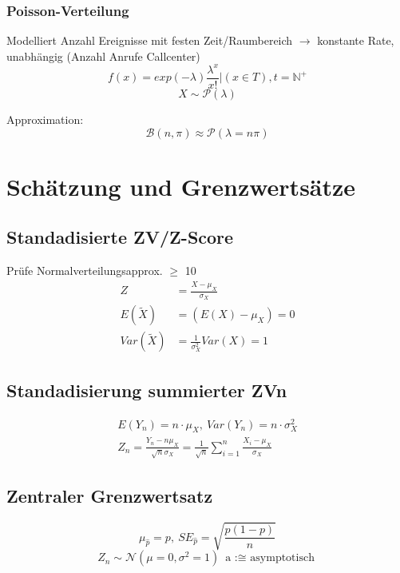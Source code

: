 \documentclass[10pt,a4paper,landscape]{article}
\begin{document}
\begin{multicols}{4}
\subsubsection{Poisson-Verteilung}
Modelliert Anzahl Ereignisse mit festen Zeit/Raumbereich $\rightarrow$ konstante Rate, unabhängig (Anzahl Anrufe Callcenter)
\[
f(x)=exp(-\lambda)\frac{\lambda^x}{x!}|(x \in T), t= \mathbb{N^+}
\]
\[
X \sim \mathcal{P}(\lambda)
\]

Approximation:
\[
\mathcal{B}(n, \pi) \approx \mathcal{P}(\lambda =n\pi)
\]


\section{Schätzung und Grenzwertsätze}

\subsection{Standadisierte ZV/Z-Score}
Prüfe Normalverteilungsapprox. $\geq$ 10
\begin{align*}
Z &= \frac{X- \mu_X}{\sigma_X} \\
E(\tilde{X}) &= (E(X)-\mu_X)=0 \\
Var(\tilde{X})&=\frac{1}{\sigma^2_X}Var(X) = 1
\end{align*}

\subsection{Standadisierung summierter ZVn}
\begin{align*}
E(Y_n) = n \cdot \mu_X, ~ Var(Y_n)= n \cdot \sigma_X^2 \\
Z_n = \frac{Y_n - n\mu_X}{\sqrt{n}\sigma_X}=\frac{1}{\sqrt{n}}\sum_{i=1}^n \frac{X_i-\mu_X}{\sigma_X}
\end{align*}

\subsection{Zentraler Grenzwertsatz}
\[
\mu_{\hat{p}}=p, ~SE_{\hat{p}}=\sqrt{\frac{p(1-p)}{n}}
\]
\[
Z_n \sim \mathcal{N}(\mu = 0, \sigma^2 = 1) ~ \text{a :$\cong$ asymptotisch}
\]


\end{multicols}
\end{document}
